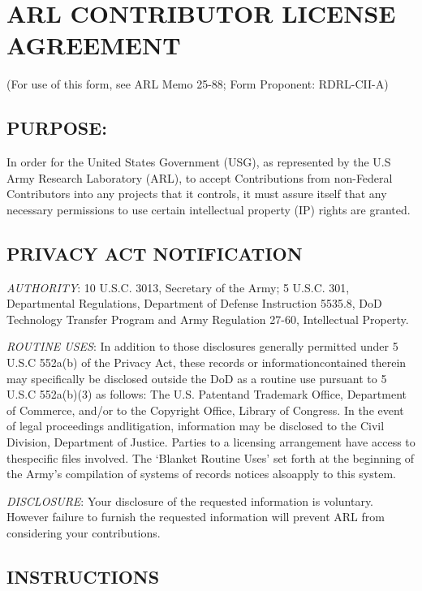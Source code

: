 \section{ARL CONTRIBUTOR LICENSE AGREEMENT}
\label{arl-contributor-license-agreement}

(For use of this form, see ARL Memo 25-88; Form Proponent: RDRL-CII-A)

\subsection{PURPOSE:}\label{purpose}

In order for the United States Government (USG), as represented by the
U.S Army Research Laboratory (ARL), to accept Contributions from
non-Federal Contributors into any projects that it controls, it must
assure itself that any necessary permissions to use certain intellectual
property (IP) rights are granted.

\subsection{PRIVACY ACT NOTIFICATION}\label{privacy-act-notification}

\emph{AUTHORITY}: 10 U.S.C. 3013, Secretary of the Army; 5 U.S.C. 301,
Departmental Regulations, Department of Defense Instruction 5535.8, DoD
Technology Transfer Program and Army Regulation 27-60, Intellectual
Property.

\emph{ROUTINE USES}: In addition to those disclosures generally
permitted under 5 U.S.C 552a(b) of the Privacy Act, these records or
informationcontained therein may specifically be disclosed outside the
DoD as a routine use pursuant to 5 U.S.C 552a(b)(3) as follows: The U.S.
Patentand Trademark Office, Department of Commerce, and/or to the
Copyright Office, Library of Congress. In the event of legal proceedings
andlitigation, information may be disclosed to the Civil Division,
Department of Justice. Parties to a licensing arrangement have access to
thespecific files involved. The `Blanket Routine Uses' set forth at the
beginning of the Army's compilation of systems of records notices
alsoapply to this system.

\emph{DISCLOSURE}: Your disclosure of the requested information is
voluntary. However failure to furnish the requested information will
prevent ARL from considering your contributions.

\subsection{INSTRUCTIONS}\label{instructions}

